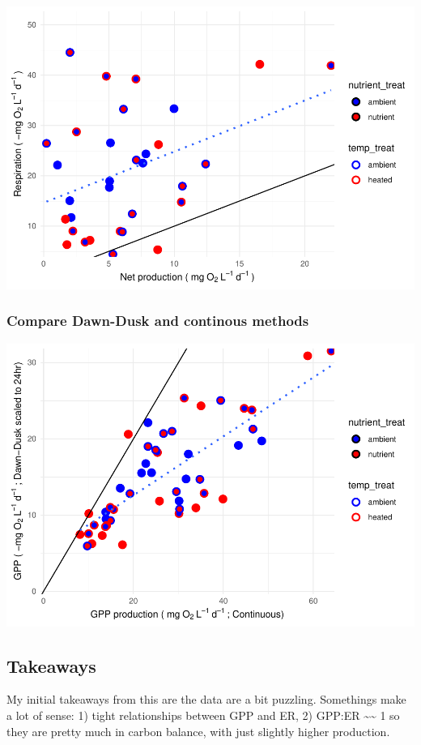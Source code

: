 \documentclass[
]{article}
\begin{document}
\includegraphics{GPP-report_files/figure-latex/cont NPP-ER scatter-1.pdf}

\hypertarget{compare-dawn-dusk-and-continous-methods}{%
\subsubsection{Compare Dawn-Dusk and continous
methods}\label{compare-dawn-dusk-and-continous-methods}}

\includegraphics{GPP-report_files/figure-latex/comb DD and Cont-1.pdf}

\hypertarget{takeaways}{%
\subsection{Takeaways}\label{takeaways}}

My initial takeaways from this are the data are a bit puzzling.
Somethings make a lot of sense: 1) tight relationships between GPP and
ER, 2) GPP:ER \textasciitilde\textasciitilde{} 1 so they are pretty much
in carbon balance, with just slightly higher production.
\end{document}
